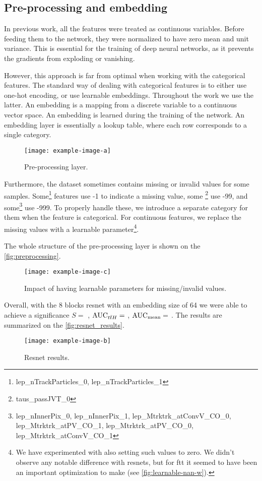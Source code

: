 \subsection{Pre-processing and embedding}


In previous work, all the features were treated as continuous variables. Before feeding them to the network, they were
normalized to have zero mean and unit variance. This is essential for the training of deep neural networks, as it
prevents the gradients from exploding or vanishing.

However, this approach is far from optimal when working with the categorical features. The standard way of dealing with
categorical features is to either use one-hot encoding, or use learnable embeddings. Throughout the work we use the
latter. An embedding is a mapping from a discrete variable to a continuous vector space. An embedding is learned during
the training of the network. An embedding layer is essentially a lookup table, where each row corresponds to a single
category.

\begin{figure}[htb]
    \centering
    \texttt{[image: example-image-a]}
    \caption{Pre-processing layer.}
    \label{fig:preprocessing}
\end{figure}

Furthermore, the dataset sometimes contains missing or invalid values for some samples.
Some\footnote{lep\_nTrackParticles\_0, lep\_nTrackParticles\_1} features use -1 to indicate a missing value, some
\footnote{taus\_passJVT\_0} use -99, and some\footnote{lep\_nInnerPix\_0, lep\_nInnerPix\_1,
    lep\_Mtrktrk\_atConvV\_CO\_0, lep\_Mtrktrk\_atPV\_CO\_1, lep\_Mtrktrk\_atPV\_CO\_0, lep\_Mtrktrk\_atConvV\_CO\_1}
use -999. To properly handle these, we introduce a separate category for them when the feature is categorical. For
continuous features, we replace the missing values with a learnable parameter\footnote{We have experimented with also
    setting such values to zero. We didn't observe any notable difference with \glspl{resnet}, but for \gls{ftt} it
    seemed to have been an important optimization to make (see \autoref{fig:learnable-nan-w}).}.

The whole structure of the pre-processing layer is shown on the \autoref{fig:preprocessing}.

\begin{figure}[htb]
    \centering
    \texttt{[image: example-image-c]}
    \caption{Impact of having learnable parameters for missing/invalid values.}
    \label{fig:learnable-nan-w}
\end{figure}

Overall, with the 8 blocks \gls{resnet} with an embedding size of 64 we were able to achieve a significance $S = $
, $\text{AUC}_{t\bar{t}H} = $ , $\text{AUC}_\text{mean} = $ . The results are summarized on the
\autoref{fig:resnet_results}.


\begin{figure}[htb]
    \centering
    \texttt{[image: example-image-b]}
    \caption{Resnet results.}
    \label{fig:resnet_results}
\end{figure}

